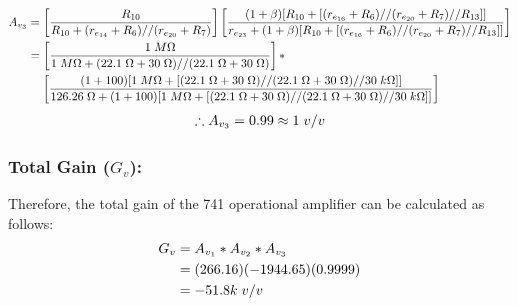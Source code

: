 \documentclass{article}
\begin{document}
	\begin{align*}
		A_{v_3} &= \left[\frac{R_{10}}{R_{10} + (r_{e_{14}} + R_6) // (r_{e_{20}} + R_7)}\right] \left[\frac{(1 + \beta) [R_{10} + [(r_{e_{16}} + R_6) // (r_{e_{20}} + R_7) // R_{13}]]}{r_{e_{23}} + (1 + \beta) [R_{10} + [(r_{e_{16}} + R_6) // (r_{e_{20}} + R_7) // R_{13}]]} \right]\\
		&= \left[\frac{1 \hspace{1mm} M\Omega}{1 \hspace{1mm} M\Omega + (22.1 \hspace{1mm} \Omega + 30 \hspace{1mm} \Omega) // (22.1 \hspace{1mm} \Omega + 30 \hspace{1mm} \Omega)}\right] *\\
		& \hspace{4mm} \left[\frac{(1 + 100)[1 \hspace{1mm} M\Omega + [(22.1 \hspace{1mm} \Omega + 30 \hspace{1mm} \Omega) // (22.1 \hspace{1mm} \Omega + 30 \hspace{1mm} \Omega) // 30 \hspace{1mm} k\Omega]]}{126.26 \hspace{1mm} \Omega + (1 + 100)[1 \hspace{1mm} M\Omega + [(22.1 \hspace{1mm} \Omega + 30 \hspace{1mm} \Omega) // (22.1 \hspace{1mm} \Omega + 30 \hspace{1mm} \Omega) // 30 \hspace{1mm} k\Omega]]}\right]
	\end{align*}
	\begin{align*}
		\therefore A_{v_3} = 0.99 \approx 1 \hspace{1mm} v/v
	\end{align*}
	\subsubsection*{Total Gain ($G_v$):}
	Therefore, the total gain of the 741 operational amplifier can be calculated as follows:
	\begin{align*}
		G_v &= A_{v_1} * A_{v_2} * A_{v_3}\\
		&= (266.16)(-1944.65)(0.9999)\\
		&= -51.8 k \hspace{1mm} v/v
	\end{align*}
\end{document}
